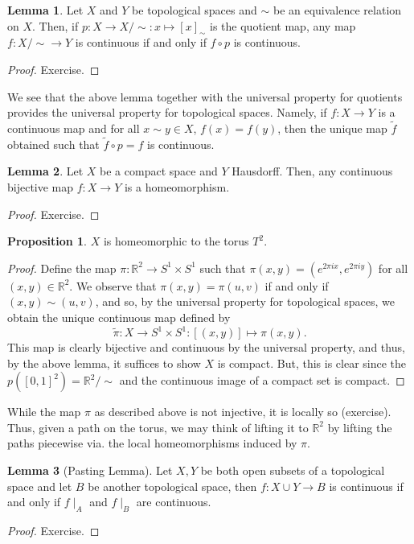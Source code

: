 \documentclass[]{article}
\theoremstyle{definition}
\theoremstyle{definition}
\newtheorem{lemma}{Lemma}[section]
\newtheorem{proposition}{Proposition}[section]
\begin{document}
\begin{lemma}
  Let \(X\) and \(Y\) be topological spaces and \(\sim\) be an equivalence relation 
  on \(X\). Then, if \(p : X \to X / \sim : x \mapsto [x]_{\sim}\) is the quotient map, 
  any map \(f : X / \sim \to Y\) is continuous if and only if \(f \circ p\) is 
  continuous.
\end{lemma}
\begin{proof}
  Exercise.
\end{proof}

We see that the above lemma together with the universal property for quotients provides 
the universal property for topological spaces. Namely, if \(f : X \to Y\) is a continuous 
map and for all \(x \sim y \in X\), \(f(x) = f(y)\), then the unique map \(\tilde f\) 
obtained such that \(\tilde f \circ p = f\) is continuous.

\begin{lemma}
  Let \(X\) be a compact space and \(Y\) Hausdorff. Then, any continuous bijective 
  map \(f : X \to Y\) is a homeomorphism.
\end{lemma}
\begin{proof}
  Exercise.
\end{proof}

\begin{proposition}
  \(X\) is homeomorphic to the torus \(T^2\).
\end{proposition}
\begin{proof}
  Define the map \(\pi : \mathbb{R}^2 \to S^1 \times S^1\) such that 
  \(\pi(x, y) = (e^{2 \pi i x}, e^{2 \pi i y})\) for all \((x, y) \in \mathbb{R}^2\).
  We observe that \(\pi(x, y) = \pi(u, v)\) if and only if \((x, y) \sim (u, v)\),
  and so, by the universal property for topological spaces, we obtain the unique 
  continuous map defined by 
  \[\tilde \pi : X \to S^1 \times S^1 : [(x, y)] \mapsto \pi(x, y).\]
  This map is clearly bijective and continuous by the universal property, and 
  thus, by the above lemma, it suffices to show \(X\) is compact. But, this 
  is clear since the \(p([0, 1]^2) = \mathbb{R}^2 / \sim\) and the continuous 
  image of a compact set is compact.
\end{proof}

While the map \(\pi\) as described above is not injective, it is locally so (exercise).
Thus, given a path on the torus, we may think of lifting it to \(\mathbb{R}^2\) by 
lifting the paths piecewise via. the local homeomorphisms induced by \(\pi\). 

\begin{lemma}[Pasting Lemma]
  Let \(X, Y\) be both open subsets of a topological space and let \(B\) be another topological space, 
  then \(f : X \cup Y \to B\) is continuous if and only if \(f \mid_A\) and \(f\mid_B\) are continuous.
\end{lemma}
\begin{proof}
  Exercise.
\end{proof}
\end{document}

